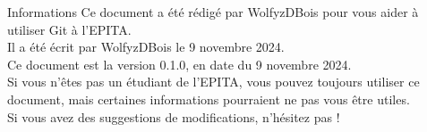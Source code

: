 \begin{theorem}[orange]{Informations}
    Ce document a été rédigé par WolfyzDBois pour vous aider à utiliser Git à l'EPITA. \\
    Il a été écrit par WolfyzDBois le 9 novembre 2024. \\
    Ce document est la version 0.1.0, en date du 9 novembre 2024. \\
    Si vous n'êtes pas un étudiant de l'EPITA, vous pouvez toujours utiliser ce document, mais certaines informations pourraient ne pas vous être utiles. \\
    Si vous avez des suggestions de modifications, n'hésitez pas ! \\
    
\end{theorem}
